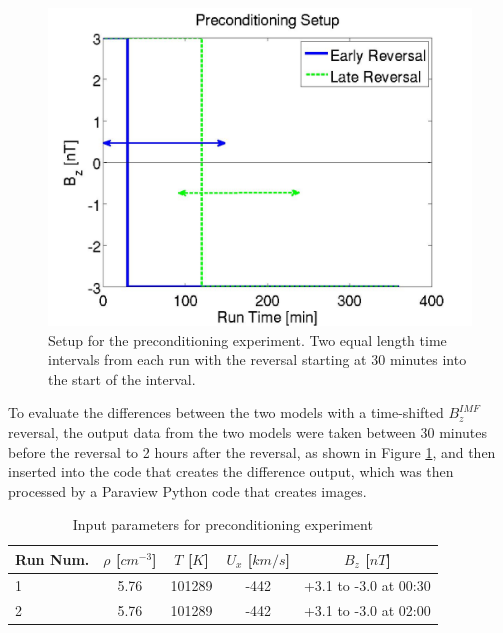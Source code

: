 \begin{figure}
	\begin{centering}
	\includegraphics[scale=0.35]{images/PreconditionSetup.jpg}
	\caption{Setup for the preconditioning experiment. Two equal length time
	intervals from each run with the reversal starting at 30 minutes into the start
	of the interval.}
	\label{fig:PreconditionSetup}
	\end{centering}
	\figSpace
\end{figure}

To evaluate the differences between the two models with a time-shifted
$B_z^{IMF}$ reversal, the output data from the two models were taken between 30
minutes before the reversal to 2 hours after the reversal, as shown in Figure
\ref{fig:PreconditionSetup}, and then inserted into the code that creates the
difference output, which was then processed by a Paraview Python code that
creates images.

\begin{table}
\begin{center}
  \caption{Input parameters for preconditioning experiment}
  \begin{tabular}{| l | c | c | c | c | }
    \hline
    \textbf{Run Num.} & \textbf{$\rho$} [$cm^{-3}$] & \textbf{$T$} [$K$] &
    \textbf{$U_x$} [$km/s$] &
    \textbf{$B_z$} [$nT$]
    \\
    \hline 
    1 & 5.76 & 101289 & -442  & +3.1 to -3.0 at 00:30 \\ \hline
    2 & 5.76 & 101289 & -442  & +3.1 to -3.0 at 02:00 \\ \hline
  \end{tabular}
  \label{table:runs12}
\end{center}
\end{table}

